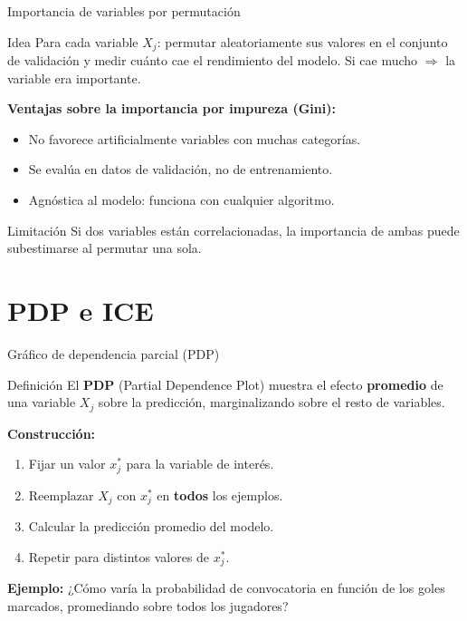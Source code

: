 \documentclass[aspectratio=169]{beamer}
\begin{document}
\begin{frame}{Importancia de variables por permutación}
  \begin{block}{Idea}
    Para cada variable $X_j$: permutar aleatoriamente sus valores en el conjunto de validación y medir cuánto cae el rendimiento del modelo. Si cae mucho $\Rightarrow$ la variable era importante.
  \end{block}

  \bigskip
  \textbf{Ventajas sobre la importancia por impureza (Gini):}
  \begin{itemize}
    \item No favorece artificialmente variables con muchas categorías.
    \item Se evalúa en datos de validación, no de entrenamiento.
    \item Agnóstica al modelo: funciona con cualquier algoritmo.
  \end{itemize}

  \bigskip
  \begin{alertblock}{Limitación}
    Si dos variables están correlacionadas, la importancia de ambas puede subestimarse al permutar una sola.
  \end{alertblock}
\end{frame}

\section{PDP e ICE}

\begin{frame}{Gráfico de dependencia parcial (PDP)}
  \begin{block}{Definición}
    El \textbf{PDP} (Partial Dependence Plot) muestra el efecto \textbf{promedio} de una variable $X_j$ sobre la predicción, marginalizando sobre el resto de variables.
  \end{block}

  \bigskip
  \textbf{Construcción:}
  \begin{enumerate}
    \item Fijar un valor $x_j^*$ para la variable de interés.
    \item Reemplazar $X_j$ con $x_j^*$ en \textbf{todos} los ejemplos.
    \item Calcular la predicción promedio del modelo.
    \item Repetir para distintos valores de $x_j^*$.
  \end{enumerate}

  \bigskip
  \textbf{Ejemplo:} ¿Cómo varía la probabilidad de convocatoria en función de los goles marcados, promediando sobre todos los jugadores?
\end{frame}
\end{document}
